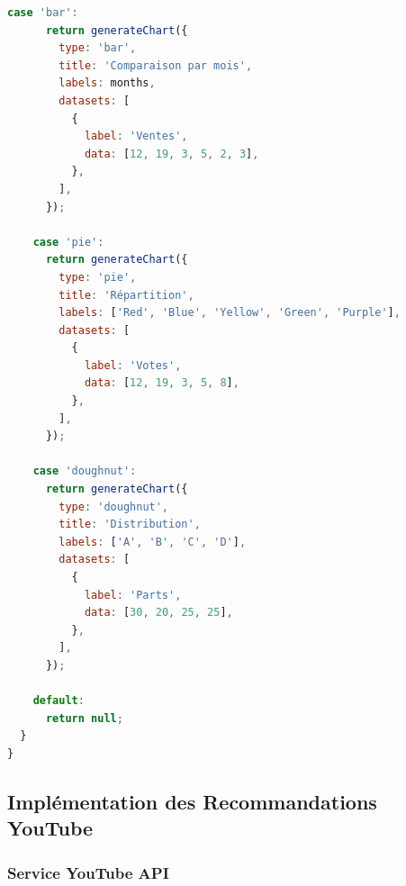 \begin{lstlisting}[language=JavaScript, caption=Utilitaire de génération de graphiques, label=code:generate-chart]
    case 'bar':
      return generateChart({
        type: 'bar',
        title: 'Comparaison par mois',
        labels: months,
        datasets: [
          {
            label: 'Ventes',
            data: [12, 19, 3, 5, 2, 3],
          },
        ],
      });

    case 'pie':
      return generateChart({
        type: 'pie',
        title: 'Répartition',
        labels: ['Red', 'Blue', 'Yellow', 'Green', 'Purple'],
        datasets: [
          {
            label: 'Votes',
            data: [12, 19, 3, 5, 8],
          },
        ],
      });

    case 'doughnut':
      return generateChart({
        type: 'doughnut',
        title: 'Distribution',
        labels: ['A', 'B', 'C', 'D'],
        datasets: [
          {
            label: 'Parts',
            data: [30, 20, 25, 25],
          },
        ],
      });

    default:
      return null;
  }
}
\end{lstlisting}

\subsection{Implémentation des Recommandations YouTube}

\subsubsection{Service YouTube API}

